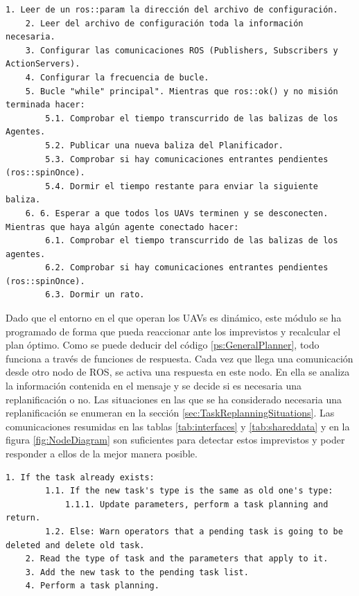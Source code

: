 \documentclass[fontsize=11pt, English=false, Español=true, Myfinal=true, twoside, numbers=noenddot]{scrbook}
\begin{document}
{\begin{lstlisting}[caption={General operation of \emph{High-Level Planner}'s code}, breaklines=true, label=ps:GeneralPlanner]
  1. Leer de un ros::param la dirección del archivo de configuración.
	2. Leer del archivo de configuración toda la información necesaria.
	3. Configurar las comunicaciones ROS (Publishers, Subscribers y ActionServers).
	4. Configurar la frecuencia de bucle.
	5. Bucle "while" principal". Mientras que ros::ok() y no misión terminada hacer:
		5.1. Comprobar el tiempo transcurrido de las balizas de los Agentes.
		5.2. Publicar una nueva baliza del Planificador.
		5.3. Comprobar si hay comunicaciones entrantes pendientes (ros::spinOnce).
		5.4. Dormir el tiempo restante para enviar la siguiente baliza.
	6. 6. Esperar a que todos los UAVs terminen y se desconecten. Mientras que haya algún agente conectado hacer:
		6.1. Comprobar el tiempo transcurrido de las balizas de los agentes.
		6.2. Comprobar si hay comunicaciones entrantes pendientes (ros::spinOnce).
		6.3. Dormir un rato.
\end{lstlisting}

Dado que el entorno en el que operan los \glspl{UAV} es dinámico, este módulo se ha programado de forma que pueda reaccionar ante los imprevistos y recalcular el plan óptimo. Como se puede deducir del código \ref{ps:GeneralPlanner}, todo funciona a través de funciones de respuesta. Cada vez que llega una comunicación desde otro nodo de \acrshort{ROS}, se activa una respuesta en este nodo. En ella se analiza la información contenida en el mensaje y se decide si es necesaria una replanificación o no. Las situaciones en las que se ha considerado necesaria una replanificación se enumeran en la sección \ref{sec:TaskReplanningSituations}. Las comunicaciones resumidas en las tablas \ref{tab:interfaces} y \ref{tab:shareddata} y en la figura \ref{fig:NodeDiagram} son suficientes para detectar estos imprevistos y poder responder a ellos de la mejor manera posible.

\begin{lstlisting}[caption={Task callback pseudocode}, breaklines=true, label=ps:IncomingTask]
	1. If the task already exists:
		1.1. If the new task's type is the same as old one's type:
			1.1.1. Update parameters, perform a task planning and return.
		1.2. Else: Warn operators that a pending task is going to be deleted and delete old task.
	2. Read the type of task and the parameters that apply to it.
	3. Add the new task to the pending task list.
	4. Perform a task planning.
\end{lstlisting}

}
\end{document}
